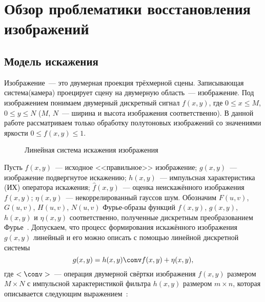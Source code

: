 \chapter{Обзор проблематики восстановления изображений}
\section{Модель искажения}\label{seqtion:distortionModel}
Изображение~--- это двумерная проекция трёхмерной сцены. Записывающая система(камера) проецирует сцену на двумерную область~--- изображение. Под изображением понимаем двумерный дискретный сигнал $f(x,y)$, где $0\leq x \leq M$, $0\leq y\leq N$ ($M$, $N$~--- ширина и высота изображения соответственно). В данной работе рассматриваем только обработку полутоновых изображений со значениями яркости $0\leq f(x,y)\leq 1$.

\begin{figure}[h!]
    \centering
    \caption{Линейная система искажения изображения}
    \label{fig:distortionScheme}
\end{figure}

Пусть $f(x,y)$~--- исходное <<правильное>> изображение; $g(x,y)$~--- изображение подвергнутое искажению; $h(x,y)$~--- импульсная характеристика (ИХ) оператора искажения; $\hat{f}(x,y)$~--- оценка неискажённого изображения $f(x,y)$; $\eta(x,y)$~--- некоррелированный гауссов шум. Обозначим $F(u,v)$, $G(u,v)$, $H(u,v)$, $N(u,v)$ Фурье-образы функций $f(x,y)$, $g(x,y)$, $h(x,y)$ и $\eta(x,y)$ соответственно, полученные дискретным преобразованием Фурье~\cite[стр.~332]{gonsalesDigital2012}.
Допускаем, что процесс формирования искажённого изображения $g(x, y)$ линейный и его можно описать с помощью линейной дискретной системы~\cite[стр.~403]{gonsalesDigital2012}
\begin{equation}\label{eq:distortion}
g(x, y) = h(x,y) \conv f(x,y) + \eta(x,y),
\end{equation}
где $<\conv>$~--- операция двумерной свёртки изображения $f(x,y)$ размером $M\times N$ с импульсной характеристикой фильтра $h(x,y)$ размером $m\times n$, которая описывается следующим выражением~\cite[стр.~298]{gonsalesDigital2012}:

